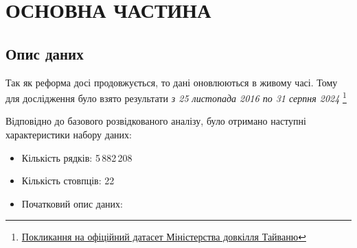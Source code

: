 \documentclass[./report.tex]{subfiles}
\begin{document}
\section{ОСНОВНА ЧАСТИНА}
\subsection{Опис даних}
Так як реформа досі продовжується, то дані оновлюються в живому часі.
Тому для дослідження було взято результати \textit{з 25 листопада 2016 по 31 серпня 2024}
\footnote{
  \href{https://data.moenv.gov.tw/en/dataset/detail/aqx_p_488}
  {Покликання на офіційний датасет Міністерства довкілля Тайваню}
}

Відповідно до базового розвідкованого аналізу, було отримано наступні характеристики набору даних:

\begin{itemize}
  \item Кількість рядків: 5\,882\,208
  \item Кількість стовпців: 22
  \item Початковий опис даних:


\end{itemize}
\end{document}
